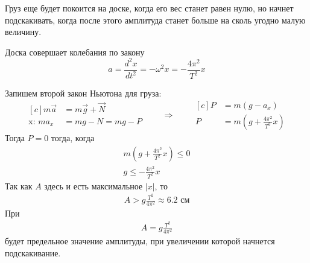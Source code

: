 \documentclass[a5paper,10pt]{article}
\begin{document}
Груз еще будет покоится на доске, когда его вес станет равен нулю, но начнет подскакивать, когда после этого амплитуда станет больше на сколь угодно малую величину.

Доска совершает колебания по закону
\begin{equation*}
     a=\frac{d^2x}{dt^2}=-\omega^2x=-\frac{4\pi^2}{T^2}x
 \end{equation*} 

Запишем второй закон Ньютона для груза:
\begin{equation*}
	\begin{aligned}[c]
		m\vec{a}&=m\vec{g}+\vec{N}\\
        \text{x: }ma_x&=mg-N=mg-P\\
	\end{aligned}
		\qquad\Longrightarrow\qquad
	\begin{aligned}[c]
		P&=m(g-a_x)\\
        P&=m(g+\frac{4\pi^2}{T^2}x)
	\end{aligned}
\end{equation*}
Тогда $P=0$ тогда, когда 
\begin{gather*}
    {}m(g+\frac{4\pi^2}{T^2}x)\leq{0}\\
    g\leq-{\frac{4\pi^2}{T^2}x}
\end{gather*}
Так как $A$ здесь и есть максимальное $|x|$, то 
\begin{gather*}
    A>{g\frac{T^2}{4\pi^2}}\approx6.2\text{ см}
\end{gather*}
При 
\begin{gather*}
    A={g\frac{T^2}{4\pi^2}}
\end{gather*}
будет предельное значение амплитуды, при увеличении которой начнется подскакивание.
\end{document}
